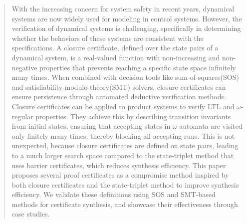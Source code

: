 \documentclass[acmlarge]{acmart}
\begin{document}
\begin{abstract}
  With the increasing concern for system safety in recent years, dynamical systems are now widely used for modeling in control systems. However, the verification of dynamical systems is challenging, specifically in determining whether the behaviors of these systems are consistent with the specifications. A closure certificate, defined over the state pairs of a dynamical system, is a real-valued function with non-increasing and non-negative properties that prevents reaching a specific state space infinitely many times. When combined with decision tools like sum-of-squares(SOS) and satisfiability-modulo-theory(SMT) solvers, closure certificates can ensure persistence through automated deductive verification methods. Closure certificates can be applied to product systems to verify LTL and $\omega$-regular properties. They achieve this by describing transition invariants from initial states, ensuring that accepting states in $\omega$-automata are visited only finitely many times, thereby blocking all accepting runs. This is not unexpected, because closure certificates are defined on state pairs, leading to a much larger search space compared to the state-triplet method that uses barrier certificates, which reduces synthesis efficiency. This paper proposes several proof certificates as a compromise method inspired by both closure certificates and the state-triplet method to improve synthesis efficiency. We validate these definitions using SOS and SMT-based methods for certificate synthesis, and showcase their effectiveness through case studies.
\end{abstract}

\end{document}
